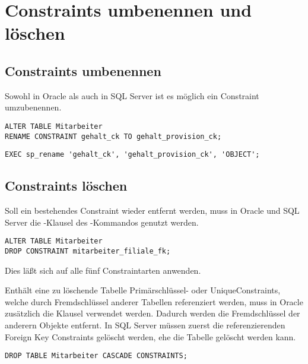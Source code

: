     \section{Constraints umbenennen und l\"oschen}
      \subsection{Constraints umbenennen}
        Sowohl in Oracle als auch in SQL Server ist es m\"oglich ein Constraint umzubenennen.
        \begin{lstlisting}[language=oracle_sql,caption={Ein Constraint umbenennen in Oracle},label=sql09_19]
ALTER TABLE Mitarbeiter
RENAME CONSTRAINT gehalt_ck TO gehalt_provision_ck;
        \end{lstlisting}
        \begin{lstlisting}[language=ms_sql,caption={Ein Constraint umbenennen in SQL Server},label=sql09_20,emphstyle={[9]\color{red}},emph={[9]sp_rename}]
EXEC sp_rename 'gehalt_ck', 'gehalt_provision_ck', 'OBJECT';
        \end{lstlisting}
      \subsection{Constraints l\"oschen}
        Soll ein bestehendes Constraint wieder entfernt werden, muss in Oracle und SQL Server die -Klausel des -Kommandos genutzt werden.
        \begin{lstlisting}[language=oracle_sql,caption={Ein Constraint l\"oschen},label=sql09_21]
ALTER TABLE Mitarbeiter
DROP CONSTRAINT mitarbeiter_filiale_fk;
        \end{lstlisting}
        Dies l\"a\ss t sich auf alle f\"unf Constraintarten anwenden.

        Enth\"alt eine zu l\"oschende Tabelle Prim\"ar\-schl\"ussel- oder
        Unique\-Constraints, welche durch Fremd\-schl\"ussel anderer Tabellen
        referenziert werden, muss in Oracle zus\"atzlich die Klausel
         verwendet werden. Dadurch werden
        die Fremdschl\"ussel der anderern Objekte entfernt. In SQL Server
        m\"ussen zuerst die referenzierenden Foreign Key Constraints gel\"oscht
        werden, ehe die Tabelle gel\"oscht werden kann.
        \begin{lstlisting}[language=oracle_sql, caption={Eine Tabelle mit
        Fremdschl\"usselbeziehungen l\"oschen},label=sql09_22]
DROP TABLE Mitarbeiter CASCADE CONSTRAINTS;
        \end{lstlisting}

